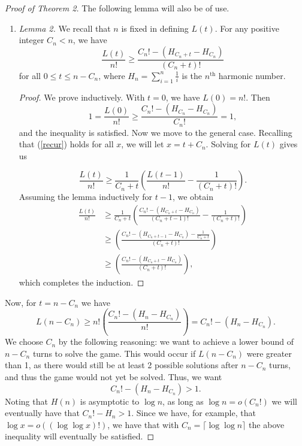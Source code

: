 \documentclass[12pt, a4paper]{article}
\newcommand{\nth}{^{\text{th}}}       %
\begin{document}
\begin{proof}[Proof of Theorem 2]
		The following lemma will also be of use.
		\begin{enumerate}[label=]
			\item\textit{Lemma 2.} We recall that $n$ is fixed in defining $L(t)$. For any positive integer $C_n < n$, we have
			\begin{equation*}
				\frac{L(t)}{n!}\ge \frac{C_{n}! - (H_{C_{n}+t} - H_{C_{n}})}{(C_n+t)!}
			\end{equation*}
			for all $0\le t\le n-C_{n}$, where $H_n=\sum_{i = 1}^n\frac{1}{i}$ is the $n\nth$ harmonic number.
		\begin{proof} We prove inductively. With $t=0$, we have $L(0) = n!$. Then
			\begin{equation*}
			1 =\frac{L(0)}{n!}\ge \frac{C_{n}! - (H_{C_{n}}-H_{C_{n}})}{C_{n}!} = 1,
			\end{equation*}
			and the inequality is satisfied. Now we move to the general case.
			Recalling that (\ref{recur}) holds for all $x$, we will
		let $x=t+C_{n}$. Solving for $L(t)$ gives us
		
			\begin{equation*}
			\frac{L(t)}{n!}
			 \ge \frac{1}{C_{n}+t}\left(\frac{L(t-1)}{n!}
			-\frac{1}{(C_{n}+t)!}\right).
			\end{equation*}
		Assuming the lemma inductively for $t-1$, we obtain
			\begin{align*}
			\frac{L(t)}{n!}
			& \ge \frac{1}{C_{n}+t}\left(\frac{C_{n}!-(H_{C_{n}+t} - H_{C_{n}})}
			{(C_{n}+t-1)!} - \frac{1}{(C_{n}+t)!}\right)\\
			& \ge \left(\frac{C_{n}! - (H_{C_{n}+t-1} - H_{C_{n}}) - \frac{1}{C_{n}+t}}
			{(C_{n}+t)!}\right)\\
			& \ge \left(\frac{C_{n}! - (H_{C_{n}+t} - H_{C_{n}})}{(C_{n}+t)!}\right),
			\end{align*}
			which completes the induction.
		\end{proof}

	\end{enumerate}
	Now, for $t = n-C_n$ we have
	\begin{equation*}
	L(n-C_{n})  \ge n!\left(\frac{C_{n}! - (H_n - H_{C_{n}})}{n!}\right)
	 = C_{n}! - (H_n-H_{C_{n}}).
	\end{equation*}
	We choose $C_{n}$ by the following reasoning: we want to achieve a lower bound of $n-C_{n}$ turns to solve the game. This would occur if $L(n-C_n)$ were greater than 1, as there would still be at least 2 possible solutions after $n-C_n$ turns, and thus the game would not yet be solved. Thus, we want
		\begin{equation*}
			C_{n}! - (H_n - H_{C_{n}}) > 1.
		\end{equation*}
		Noting that $H(n)$ is asymptotic to $\log n$, as long as $\log n = o(C_n!)$ we will eventually have that $C_n!-H_n > 1$. Since we have, for example, that $\log x = o((\log \log x)!)$, we have that with $C_n = \lceil \log \log n \rceil$ the above inequality will eventually be satisfied.
		

\end{proof}
\end{document}
